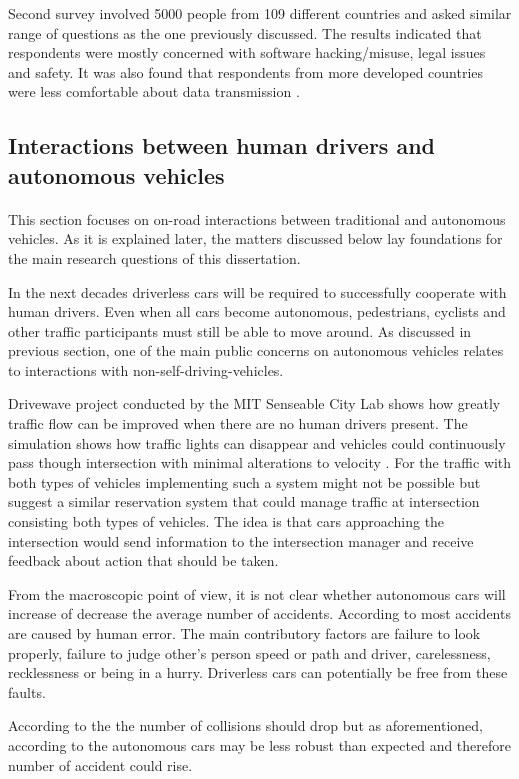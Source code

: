 \documentclass[11pt,english]{article}
\begin{document}
\par

Second survey involved 5000 people from 109 different countries and asked similar range of questions as the one previously discussed. The results indicated that respondents were mostly concerned with software hacking/misuse, legal issues and safety. It was also found that respondents from more developed countries were less comfortable about data transmission \citep{kyriakidis2015public}.



\subsection{Interactions between human drivers and autonomous vehicles}
\paragraph{}
This section focuses on on-road interactions between traditional and autonomous vehicles. As it is explained later, the matters discussed below lay foundations for the main research questions of this dissertation.

\par
In the next decades driverless cars will be required to successfully cooperate with human drivers. Even when all cars become autonomous, pedestrians, cyclists and other traffic participants must still be able to move around. As discussed in previous section, one of the main public concerns on autonomous vehicles relates to interactions with non-self-driving-vehicles.

\par
Drivewave project conducted by the MIT Senseable City Lab shows how greatly traffic flow can be  improved when there are no human drivers present. The simulation shows how traffic lights can disappear and vehicles could continuously pass though intersection with minimal alterations to velocity \citep{drivewave}. For the traffic with both types of vehicles implementing such a system might not be possible but \citet{dresner2007sharing} suggest a similar reservation system that could manage traffic at intersection consisting both types of vehicles. The idea is that cars approaching the intersection would send information to the intersection manager and receive feedback about action that should be taken.





\par
From the macroscopic point of view, it is not clear whether autonomous cars will increase of decrease the average number of accidents. According to \citet{excel} most accidents are caused by human error. The main contributory factors are failure to look properly, failure to judge other's person speed or path and driver, carelessness, recklessness or being in a hurry. Driverless cars can potentially be free from these faults.
\par
According to the \citet{pathwaytodriverless} the number of collisions should drop but as aforementioned, according to \citet{sivak2015road} the autonomous cars may be less robust than expected and therefore number of accident could rise. 
\end{document}

